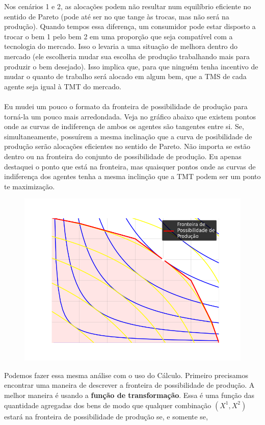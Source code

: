 \documentclass[a4paper,11pt,oneside]{book}
\theoremstyle{definition}
\theoremstyle{break}
\begin{document}
Nos cenários 1 e 2, as alocações podem não resultar num equilíbrio eficiente no sentido de Pareto (pode até ser no que tange às trocas, mas não será na produção). Quando tempos essa diferença, um consumidor pode estar disposto a trocar o bem 1 pelo bem 2 em uma proporção que seja compatível com a tecnologia do mercado. Isso o levaria a uma situação de melhora dentro do mercado (ele escolheria mudar sua escolha de produção trabalhando mais para produzir o bem desejado). Isso implica que, para que ninguém tenha incentivo de mudar o quanto de trabalho será alocado em algum bem, que a TMS de cada agente seja igual à TMT do mercado.
\\~\\
Eu mudei um pouco o formato da fronteira de possibilidade de produção para torná-la um pouco mais arredondada. Veja no gráfico abaixo que existem pontos onde as curvas de indiferença de ambos os agentes são tangentes entre si. Se, simultaneamente, possuírem a mesma inclinação que a curva de posibilidade de produção serão alocações eficientes no sentido de Pareto. Não importa se estão dentro ou na fronteira do conjunto de possibilidade de produção. Eu apenas destaquei o ponto que está na fronteira, mas quaisquer pontos onde as curvas de indiferença dos agentes tenha a mesma inclinção que a TMT podem ser um ponto te maximização.

\begin{figure}[H]
	\centering
	\includegraphics[scale=0.6]{cap33_11-edgeworth_prod.png}
\end{figure}

Podemos fazer essa mesma análise com o uso do Cálculo. Primeiro precisamos encontrar uma maneira de descrever a fronteira de possibilidade de produção. A melhor maneira é usando a \textbf{função de transformação}. Essa é uma função das quantidade agregadas dos bens de modo que qualquer combinação $(X^1,X^2)$ estará na fronteira de possibilidade de produção se, e somente se,
\end{document}
